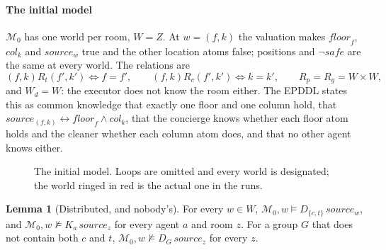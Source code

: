\documentclass[11pt,a4paper]{article}
\theoremstyle{definition}
\newtheorem{lemma}{Lemma}
\newcommand{\Mod}{\mathcal{M}}
\newcommand{\safe}{\mathit{safe}}
\newcommand{\src}[1]{\mathit{source}_{#1}}
\newcommand{\fl}[1]{\mathit{floor}_{#1}}
\newcommand{\cl}[1]{\mathit{col}_{#1}}
\begin{document}
\paragraph{The initial model}
$\Mod_0$ has one world per room, $W = Z$. At $w = (f, k)$ the valuation makes
$\fl{f}$, $\cl{k}$ and $\src{w}$ true and the other location atoms false;
positions and $\neg\safe$ are the same at every world. The relations are
\[
  (f,k) \mathrel{R_t} (f',k') \iff f = f', \qquad
  (f,k) \mathrel{R_c} (f',k') \iff k = k', \qquad
  R_p = R_g = W \times W,
\]
and $W_d = W$: the executor does not know the room either. The EPDDL states this
as common knowledge that exactly one floor and one column hold, that
$\src{(f,k)} \leftrightarrow \fl{f} \wedge \cl{k}$, that the concierge knows
whether each floor atom holds and the cleaner whether each column atom does,
and that no other agent knows either.

\begin{figure}[H]
\centering
{}
\caption{The initial model. Loops are omitted and every world is designated;
the world ringed in red is the actual one in the runs.}
\label{fig:model}
\end{figure}

\begin{lemma}[Distributed, and nobody's]
\label{lem:dist}
For every $w \in W$, $\Mod_0, w \models D_{\{c,t\}}\,\src{w}$, and
$\Mod_0, w \not\models K_a\,\src{z}$ for every agent $a$ and room $z$. For a
group $G$ that does not contain both $c$ and $t$,
$\Mod_0, w \not\models D_G\,\src{z}$ for every $z$.
\end{lemma}
\end{document}
